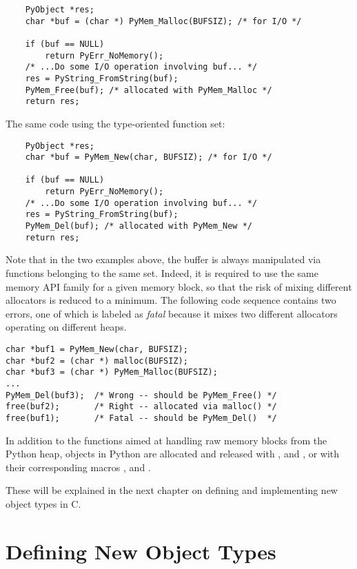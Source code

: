 \documentclass{manual}
\begin{document}
\begin{verbatim}
    PyObject *res;
    char *buf = (char *) PyMem_Malloc(BUFSIZ); /* for I/O */

    if (buf == NULL)
        return PyErr_NoMemory();
    /* ...Do some I/O operation involving buf... */
    res = PyString_FromString(buf);
    PyMem_Free(buf); /* allocated with PyMem_Malloc */
    return res;
\end{verbatim}

The same code using the type-oriented function set:

\begin{verbatim}
    PyObject *res;
    char *buf = PyMem_New(char, BUFSIZ); /* for I/O */

    if (buf == NULL)
        return PyErr_NoMemory();
    /* ...Do some I/O operation involving buf... */
    res = PyString_FromString(buf);
    PyMem_Del(buf); /* allocated with PyMem_New */
    return res;
\end{verbatim}

Note that in the two examples above, the buffer is always
manipulated via functions belonging to the same set. Indeed, it
is required to use the same memory API family for a given
memory block, so that the risk of mixing different allocators is
reduced to a minimum. The following code sequence contains two errors,
one of which is labeled as \emph{fatal} because it mixes two different
allocators operating on different heaps.

\begin{verbatim}
char *buf1 = PyMem_New(char, BUFSIZ);
char *buf2 = (char *) malloc(BUFSIZ);
char *buf3 = (char *) PyMem_Malloc(BUFSIZ);
...
PyMem_Del(buf3);  /* Wrong -- should be PyMem_Free() */
free(buf2);       /* Right -- allocated via malloc() */
free(buf1);       /* Fatal -- should be PyMem_Del()  */
\end{verbatim}

In addition to the functions aimed at handling raw memory blocks from
the Python heap, objects in Python are allocated and released with
,  and
, or with their corresponding macros
,  and
.

These will be explained in the next chapter on defining and
implementing new object types in C.


\chapter{Defining New Object Types \label{newTypes}}
\end{document}
